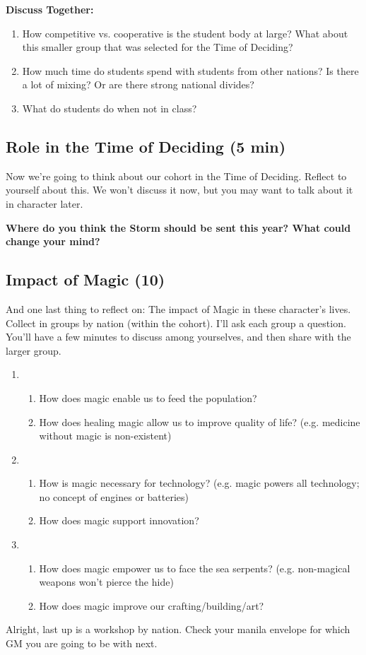 \documentclass[green]{GL2020}
\begin{document}
\textbf{Discuss Together:}
\begin{enumerate}
	\item How competitive vs. cooperative is the student body at large? What about this smaller group that was selected for the Time of Deciding?
	\item How much time do students spend with students from other nations? Is there a lot of mixing? Or are there strong national divides?
	\item What do students do when not in class? 
\end{enumerate}

\subsection*{Role in the Time of Deciding (5 min)}
Now we’re going to think about our cohort in the Time of Deciding. Reflect to yourself about this. We won't discuss it now, but you may want to talk about it in character later.

\textbf{Where do you think the Storm should be sent this year? What could change your mind?}

\subsection*{Impact of Magic (10)}
And one last thing to reflect on: The impact of Magic in these character’s lives. Collect in groups by nation (within the cohort). I’ll ask each group a question. You’ll have a few minutes to discuss among yourselves, and then share with the larger group.
\begin{enumerate}
	\item \pFarm{}
	\begin{enumerate}
		\item How does magic enable us to feed the population?
		\item How does healing magic allow us to improve quality of life? (e.g. medicine without magic is non-existent)
	\end{enumerate}
	\item \pTech{}
	\begin{enumerate}
		\item How is magic necessary for technology? (e.g. magic powers all technology; no concept of engines or batteries)
		\item How does magic support innovation?
	\end{enumerate}
	\item \pShip{}
	\begin{enumerate}
		\item How does magic empower us to face the sea serpents? (e.g. non-magical weapons won’t pierce the hide)
		\item How does magic improve our crafting/building/art?
	\end{enumerate}
\end{enumerate}

Alright, last up is a workshop by nation. Check your manila envelope for which GM you are going to be with next.
\end{document}
